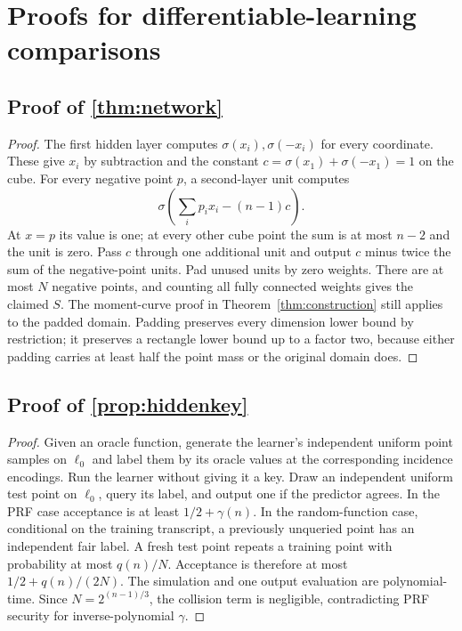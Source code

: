 \section{Proofs for differentiable-learning comparisons}\label{app:proofs-F}

\subsection[Proof of result network]{Proof of \cref{thm:network}}\label{proof:network}
\begin{proof}
The first hidden layer computes $\sigma(x_i),\sigma(-x_i)$ for every coordinate. These give $x_i$ by subtraction and the constant $c=\sigma(x_1)+\sigma(-x_1)=1$ on the cube. For every negative point $p$, a second-layer unit computes
\[
 \sigma\left(\sum_i p_ix_i-(n-1)c\right).
\]
At $x=p$ its value is one; at every other cube point the sum is at most $n-2$ and the unit is zero. Pass $c$ through one additional unit and output $c$ minus twice the sum of the negative-point units. Pad unused units by zero weights. There are at most $N$ negative points, and counting all fully connected weights gives the claimed $S$. The moment-curve proof in Theorem~\ref{thm:construction} still applies to the padded domain. Padding preserves every dimension lower bound by restriction; it preserves a rectangle lower bound up to a factor two, because either padding carries at least half the point mass or the original domain does.
\end{proof}

\subsection[Proof of result hiddenkey]{Proof of \cref{prop:hiddenkey}}\label{proof:hiddenkey}
\begin{proof}
Given an oracle function, generate the learner's independent uniform point samples on $\ell_0$ and label them by its oracle values at the corresponding incidence encodings. Run the learner without giving it a key. Draw an independent uniform test point on $\ell_0$, query its label, and output one if the predictor agrees. In the PRF case acceptance is at least $1/2+\gamma(n)$. In the random-function case, conditional on the training transcript, a previously unqueried point has an independent fair label. A fresh test point repeats a training point with probability at most $q(n)/N$. Acceptance is therefore at most $1/2+q(n)/(2N)$. The simulation and one output evaluation are polynomial-time. Since $N=2^{(n-1)/3}$, the collision term is negligible, contradicting PRF security for inverse-polynomial $\gamma$.
\end{proof}

